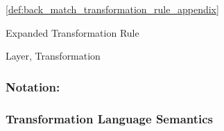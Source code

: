 \cref{def:back_match_transformation_rule_appendix} 



\begin{definition}{Expanded Transformation Rule}
\label{def:transformation_rule_expansion_appendix}


\end{definition}


\begin{definition}{Layer, Transformation}
\label{def:layer_transformation_appendix}

\end{definition}


\subsubsection{\textbf{Notation:}}




\subsubsection{Transformation Language Semantics}

